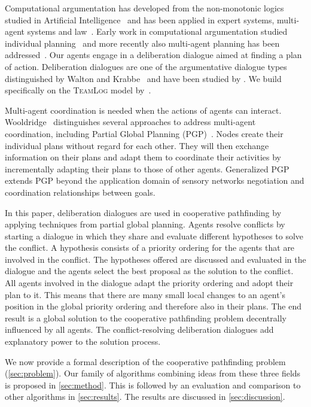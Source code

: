 Computational argumentation has developed from the non-monotonic logics studied 
in Artificial Intelligence~\cite{dung1995} and has been applied in expert 
systems, multi-agent systems and law~\cite{vanEemerenEtal2014ch11}. Early work in 
computational argumentation studied individual planning~\cite{pollock1995} and 
more recently also multi-agent planning has been 
addressed~\cite{ferrando2012,pardo2011}. Our agents engage in a deliberation 
dialogue aimed at finding a plan of action. Deliberation dialogues are one of 
the argumentative dialogue types distinguished by Walton and 
Krabbe~ and have been studied by 
\cite{mcburney2007,walton2014}. We build specifically on the \textsc{TeamLog} model by~.

Multi-agent coordination is needed when the actions of agents can interact.
Wooldridge~ distinguishes several 
approaches to address multi-agent coordination, including Partial Global 
Planning (PGP)~\cite{durfee1991}. Nodes create their individual plans without 
regard for each other. They will then exchange information on their plans and
adapt them to coordinate their activities by incrementally 
adapting their plans to those of other agents.
Generalized PGP \cite{decker1992} extends PGP beyond the application domain of sensory networks %
negotiation and coordination relationships between goals. 

In this paper, deliberation dialogues are used in cooperative pathfinding by applying techniques from
partial global planning. Agents resolve conflicts by starting a dialogue in
which they share and evaluate different hypotheses to solve the conflict. A
hypothesis consists of a priority ordering for the agents that are involved in
the conflict. The hypotheses offered are discussed and evaluated in the
dialogue and the agents select the best proposal as the solution
to the conflict. All agents involved in the dialogue adapt the priority
ordering and adopt their plan to it. This means that there are many small local
changes to an agent's position in the global priority ordering and therefore also in
their plans. The end result is a global solution to the cooperative pathfinding
problem decentrally influenced by all agents. The conflict-resolving deliberation dialogues add explanatory power to the solution process.

We now provide a formal description of the cooperative pathfinding problem 
(\autoref{sec:problem}). Our family 
of algorithms combining ideas from these three fields is proposed in 
\autoref{sec:method}. This is followed by an evaluation and comparison to other 
algorithms in \autoref{sec:results}. The results are discussed in 
\autoref{sec:discussion}.
